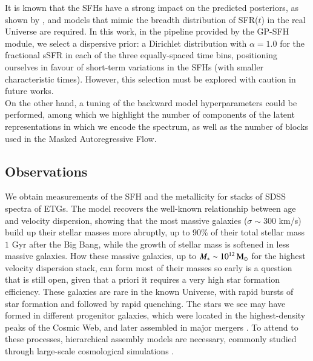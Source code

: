 It is known that the SFHs have a strong impact on the predicted posteriors, as shown by \cite{Leja_2019}, and models that mimic the breadth  distribution of SFR($t$) in the real Universe are required. In this work, in the pipeline provided by the GP-SFH module, we select a dispersive prior: a Dirichlet distribution with $\alpha=1.0$ for the fractional sSFR in each of the three equally-spaced time bins, positioning ourselves in favour of short-term variations in the SFHs (with smaller characteristic times). However, this selection must be explored with caution in future works.\\

On the other hand, a tuning of the backward model hyperparameters could be performed, among which we highlight the number of components of the latent representations in which we encode the spectrum, as well as the number of blocks used in the Masked Autoregressive Flow.


\subsection{Observations}

We obtain measurements of the SFH and the metallicity for stacks of SDSS spectra of ETGs. The model recovers the well-known relationship between  age and velocity dispersion, showing that the most massive galaxies ($\sigma \sim 300$ km/s) build up their stellar masses more abruptly, up to 90\% of their total stellar mass $1$ Gyr after the Big Bang, while the growth of stellar mass is softened in less massive galaxies. How these massive galaxies, up to $M_{*} \sim 10^{12} \, \rm M_{\odot}$ for the highest velocity dispersion stack, can form most of their masses so early is a question that is still open, given that a priori it requires a very high star formation efficiency. These galaxies are rare in the known Universe, with rapid bursts of star formation and followed by rapid quenching. The stars we see may have formed in different progenitor galaxies, which were located in the highest-density peaks of the Cosmic Web, and later assembled in major mergers \citep{conselice2007assembly}. To attend to these processes, hierarchical assembly models are necessary, commonly studied through large-scale cosmological simulations \citep[e.g.][]{Angeloudi_2023}. \\


